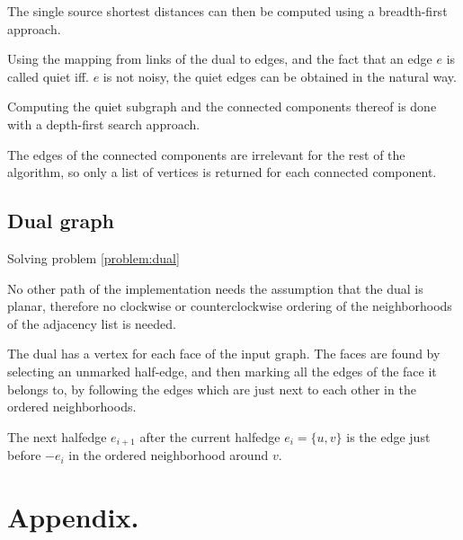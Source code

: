\documentclass{article}
\begin{document}
		The single source shortest distances can then be computed using a breadth-first approach.

		Using the mapping from links of the dual to edges, and the fact that an edge $e$ is called quiet iff. $e$ is not noisy, the quiet edges can be obtained in the natural way.

		Computing the quiet subgraph and the connected components thereof is done with a depth-first search approach.

		The edges of the connected components are irrelevant for the rest of the algorithm, so only a list of vertices is returned for each connected component.


	\subsection{Dual graph}\label{impl:dual}

		Solving problem \ref{problem:dual}

		No other path of the implementation needs the assumption that the dual is planar, therefore no clockwise or counterclockwise ordering of the neighborhoods of the adjacency list is needed.

		The dual has a vertex for each face of the input graph. The faces are found by selecting an unmarked half-edge, and then marking all the edges of the face it belongs to, by following the edges which are just next to each other in the ordered neighborhoods.

		The next halfedge $e_{i+1}$ after the current halfedge $e_i = \{u, v\}$ is the edge just before $-e_i$ in the ordered neighborhood around $v$.



\section{Appendix.}
	
\end{document}
